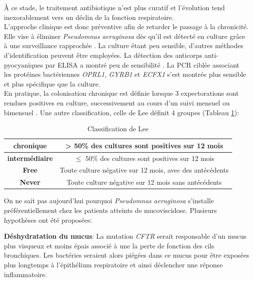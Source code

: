 \documentclass[12pt,a4paper]{article}
\begin{document}
À ce stade, le traitement antibiotique n’est plus curatif et l'évolution tend inexorablement vers un déclin de la fonction respiratoire. \\
L'approche clinique est donc préventive afin de retarder le passage à la chronicité. Elle vise à éliminer \textit{Pseudomnas aeruginosa} dès qu'il est détecté en culture grâce à une surveillance rapprochée \cite{LeBourgeois}. La culture étant peu sensible, d’autres méthodes d'identification peuvent être employées. La détection des anticorps anti-pyocyaniques par ELISA a montré peu de sensibilité \cite{Plesiat}.
La PCR ciblée associant les protéines bactériennes \textit{OPRL1}, \textit{GYRB1} et \textit{ECFX1}  s’est montrée plus sensible et plus spécifique que la culture\cite{LeGall}. \\
En pratique, la colonisation chronique est définie lorsque 3 expectorations sont rendues positives en culture, successivement au cours d’un suivi mensuel ou bimensuel \cite{LeBourgeois}.
Une autre classification, celle de Lee\cite{Lee2003} définit 4 groupes (Tableau \ref{lee}):

 \begin{table}[h]
     \centering
     \begin{tabular}{|c|c|}
      \hline
          \textbf{chronique} & > 50\% des cultures sont positives sur 12 mois \\
         \hline
         \textbf{intermédiaire} & $\leq$ 50\% des cultures sont positives sur  12 mois\\
          \hline
          \textbf{Free} & Toute culture négative sur 12 mois, avec des antécédents\\
         \hline
	    \textbf{Never} &Toute culture négative sur 12 mois sans antécédents \\
	      \hline
     \end{tabular}
     \caption{Classification de Lee \cite{Lee2003}}
     \label{lee}
 \end{table}


On ne sait pas aujourd’hui pourquoi \textit{Pseudomnas aeruginosa} s’installe préférentiellement chez les patients atteints de mucoviscidose. Plusieurs hypothèses ont été proposées:

\textbf{Déshydratation du mucus}\cite{Davies}:
La mutation \textit{CFTR} serait responsable d'un mucus plus visqueux et moins épais associé à une la perte de fonction des cils bronchiques. Les bactéries seraient alors piégées dans ce mucus pour être exposées plus longtemps à l'épithélium respiratoire et ainsi déclencher une réponse inflammatoire.
\end{document}
